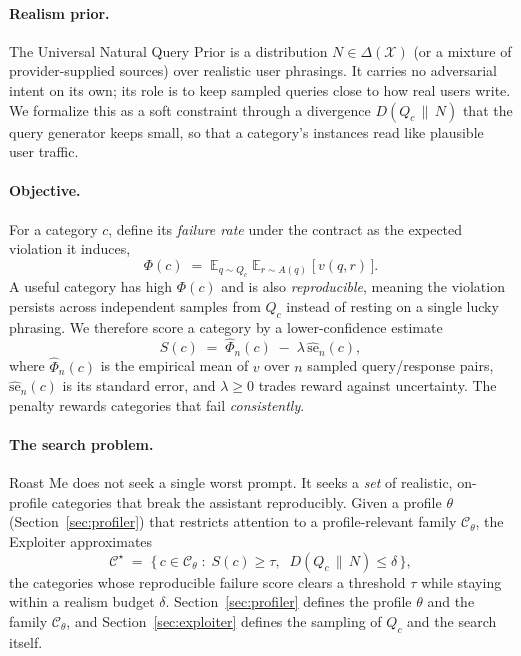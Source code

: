 \documentclass[11pt,a4paper]{article}
\begin{document}
\paragraph{Realism prior.}
The Universal Natural Query Prior is a distribution $N \in \Delta(\mathcal{X})$
(or a mixture of provider-supplied sources) over realistic user phrasings. It
carries no adversarial intent on its own; its role is to keep sampled queries
close to how real users write. We formalize this as a soft constraint through a
divergence $D\!\left(Q_c \,\|\, N\right)$ that the query generator keeps small,
so that a category's instances read like plausible user traffic.

\paragraph{Objective.}
For a category $c$, define its \emph{failure rate} under the contract as the
expected violation it induces,
\begin{equation}
  \Phi(c) \;=\; \mathbb{E}_{q \sim Q_c}\; \mathbb{E}_{r \sim A(q)}\;
  \big[\, v(q, r) \,\big].
  \label{eq:phi}
\end{equation}
A useful category has high $\Phi(c)$ and is also \emph{reproducible}, meaning the
violation persists across independent samples from $Q_c$ instead of resting on a
single lucky phrasing. We therefore score a category by a lower-confidence
estimate
\begin{equation}
  S(c) \;=\; \hat\Phi_n(c) \;-\; \lambda \, \widehat{\mathrm{se}}_n(c),
  \label{eq:score}
\end{equation}
where $\hat\Phi_n(c)$ is the empirical mean of $v$ over $n$ sampled
query/response pairs, $\widehat{\mathrm{se}}_n(c)$ is its standard error, and
$\lambda \ge 0$ trades reward against uncertainty. The penalty rewards categories
that fail \emph{consistently}.

\paragraph{The search problem.}
Roast Me does not seek a single worst prompt. It seeks a \emph{set} of realistic,
on-profile categories that break the assistant reproducibly. Given a profile
$\theta$ (Section~\ref{sec:profiler}) that restricts attention to a
profile-relevant family $\mathcal{C}_\theta$, the Exploiter approximates
\begin{equation}
  \mathcal{C}^\star \;=\;
  \big\{\, c \in \mathcal{C}_\theta \;:\; S(c) \ge \tau,\;\;
  D\!\left(Q_c \,\|\, N\right) \le \delta \,\big\},
  \label{eq:search}
\end{equation}
the categories whose reproducible failure score clears a threshold $\tau$ while
staying within a realism budget $\delta$. Section~\ref{sec:profiler} defines the
profile $\theta$ and the family $\mathcal{C}_\theta$, and
Section~\ref{sec:exploiter} defines the sampling of $Q_c$ and the search itself.
\end{document}
